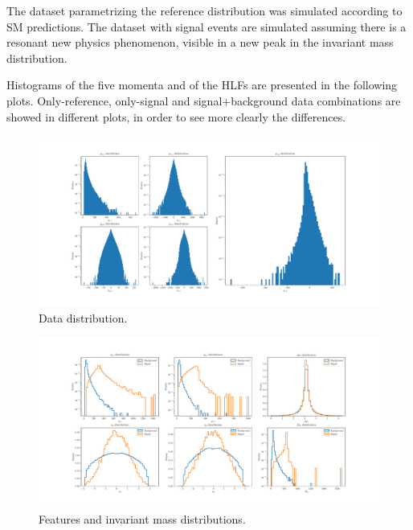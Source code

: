 The dataset parametrizing the reference distribution was simulated according to SM predictions. The dataset with signal events are simulated assuming there is a resonant new physics phenomenon, visible in a new peak in the invariant mass distribution.

Histograms of the five momenta and of the HLFs are presented in the following plots. Only-reference, only-signal and signal+background data combinations are showed in different plots, in order to see more clearly the differences.

\begin{figure}[H]
	\begin{center}
		\includegraphics[width=1.0\textwidth]{Python/Z/data.pdf}
		\caption{Data distribution.}
		\label{fig:DATA_DISTRIBUTIONS}
	\end{center}
\end{figure}

\begin{figure}[H]
	\begin{center}
		\includegraphics[width=1.0\textwidth]{Python/Z/features.pdf}
		\caption{Features and invariant mass distributions.}
		\label{fig:FEATURES_DISTRIBUTIONS}
	\end{center}
\end{figure}

